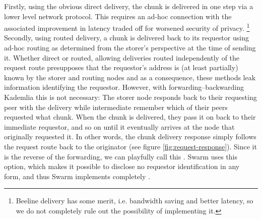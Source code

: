 Firstly, using the obvious direct delivery, the chunk is delivered in one step via a lower level network protocol. This requires an ad-hoc connection with the associated improvement in latency traded off for worsened security of privacy.%
%
\footnote{Beeline delivery has some merit, i.e. bandwidth saving and better latency, so we do not completely rule out the possibility of implementing it. 
}
Secondly, using routed delivery, a chunk is delivered back to its requestor using ad-hoc routing as determined from the storer's perspective at the time of sending it. Whether direct or routed, allowing deliveries routed independently of the request route presupposes that the requestor's address is (at least partially) known by the storer and routing nodes and as a consequence, these methods leak information identifying the requestor. However, with forwarding--backwarding Kademlia this is not necessary: The storer node responds back to their requesting peer with the delivery while intermediate  remember which of their peers requested what chunk. When the chunk is delivered, they pass it on back to their immediate requestor, and so on until it eventually arrives at the node that originally requested it. In other words, the chunk delivery response simply follows the request route back to the originator (see figure \ref{fig:request-response}).  Since it is the reverse of the forwarding, we can playfully call this . Swarm uses this option, which makes it possible to disclose no requestor identification in any form, and thus Swarm implements completely . 

